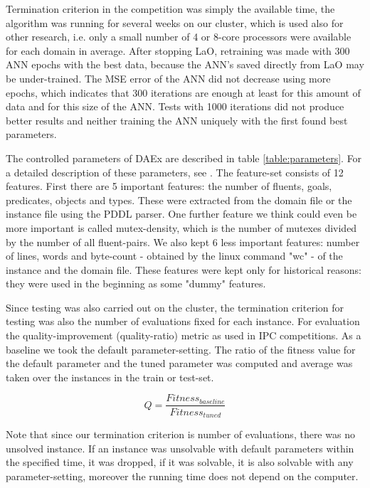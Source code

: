 \documentclass{MYsig-alternate}
\begin{document}
Termination criterion in the competition was simply the available time, the algorithm was running for several weeks on our cluster, which is used also for other research, i.e. only a small number of 4 or 8-core processors were available for each domain in average. After stopping LaO, retraining was made with 300 ANN epochs with the best data, because the ANN's saved directly from LaO may be under-trained. The MSE error of the ANN did not decrease using more epochs, which indicates that 300 iterations are enough at least for this amount of data and for this size of the ANN. Tests with 1000 iterations did not produce better results and neither training the ANN uniquely with the first found best parameters.

The controlled parameters of DAEx are described in table \ref{table:parameters}. For a detailed description of these parameters, see \cite{BibGECCO:2010}. The feature-set consists of 12 features. First there are 5 important features: the number of fluents, goals, predicates, objects and types. These were extracted from the domain file or the instance file using the PDDL parser. One further feature we think could even be more important is called mutex-density, which is the number of mutexes divided by the number of all fluent-pairs. We also kept 6 less important features: number of lines, words and byte-count - obtained by the linux command "wc" - of the instance and the domain file. These features were kept only for historical reasons: they were used in the beginning as some "dummy" features.

Since testing was also carried out on the cluster, the termination criterion for testing was also the number of evaluations fixed for each instance. For evaluation the quality-improvement (quality-ratio) metric as used in IPC competitions. As a baseline we took the default parameter-setting. The ratio of the fitness value for the default parameter and the tuned parameter was computed and average was taken over the instances in the train or test-set. 

\begin{equation}Q=\frac{Fitness_{baseline}}{Fitness_{tuned}}\end{equation}

Note that since our termination criterion is number of evaluations, there was no unsolved instance. If an instance was unsolvable with default parameters within the specified time, it was dropped, if it was solvable, it is also solvable with any parameter-setting, moreover the running time does not depend on the computer. 
\end{document}
